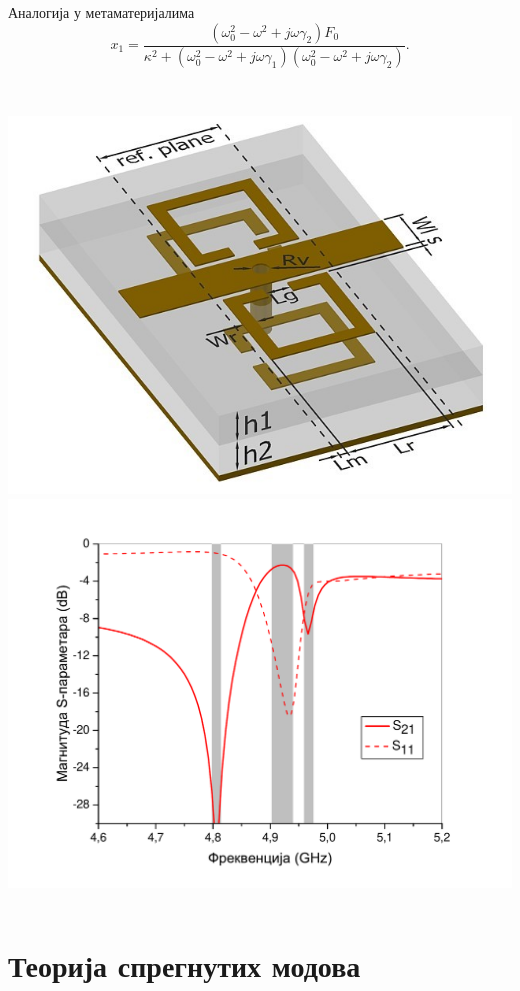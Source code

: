 \documentclass{beamer}
\begin{document}
\begin{frame}[t]{Аналогија у метаматеријалима}
    \begin{equation*}
        \label{eq:pomeraj}
        x_1 = \frac{\left( \omega_0^2 - \omega^2 + j\omega\gamma_2 \right)F_0}{\kappa^2 + \left( \omega_0^2 - \omega^2 + j\omega\gamma_1 \right) \left( \omega_0^2 - \omega^2 + j\omega\gamma_2   \right)}.
    \end{equation*}\\[1cm]
    \begin{columns}[c]
    \includegraphics[width=0.8\linewidth]{sl_eit/jc2.jpg}
    \includegraphics[width=0.8\linewidth]{sl_eit/mag.pdf}
    \end{columns}
\end{frame}

\section{Теорија спрегнутих модова}
\end{document}
